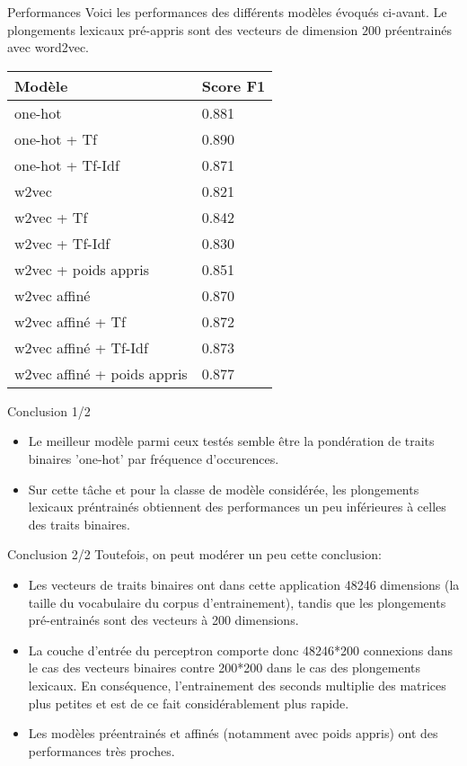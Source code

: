 \documentclass{beamer}
\begin{document}
\begin{frame}{Performances}
  Voici les performances des diff\'erents mod\`eles \'evoqu\'es ci-avant. Le plongements lexicaux pr\'e-appris sont des vecteurs de dimension $200$ pr\'eentrain\'es avec word2vec.

  \begin{center}
    \begin{tabular}{|l|l|}\hline
      Mod\`ele & Score F1\\\hline
      one-hot  & 0.881\\\hline
      one-hot + Tf & 0.890  \\\hline
      one-hot + Tf-Idf & 0.871  \\\hline
      w2vec & 0.821 \\\hline
      w2vec + Tf & 0.842 \\\hline
      w2vec + Tf-Idf & 0.830 \\\hline
      w2vec + poids appris & 0.851  \\\hline
      w2vec affin\'e & 0.870 \\\hline
      w2vec affin\'e + Tf & 0.872 \\\hline
      w2vec affin\'e + Tf-Idf & 0.873 \\\hline
      w2vec affin\'e + poids appris & 0.877 \\\hline
    \end{tabular}
  \end{center}  
\end{frame}

\begin{frame}{Conclusion 1/2}
  \begin{itemize}
  \item Le meilleur mod\`ele parmi ceux test\'es semble \^etre la pond\'eration de traits binaires 'one-hot' par fr\'equence d'occurences.
  \item Sur cette t\^ache et pour la classe de mod\`ele consid\'er\'ee, les plongements lexicaux pr\'entrain\'es obtiennent des performances un peu inf\'erieures \`a celles des traits binaires.
  \end{itemize}
\end{frame}

\begin{frame}{Conclusion 2/2}
  Toutefois, on peut mod\'erer un peu cette conclusion:
  \begin{itemize}
  \item Les vecteurs de traits binaires ont dans cette application 48246 dimensions (la taille du vocabulaire du corpus d'entrainement), tandis que les plongements pr\'e-entrain\'es sont des vecteurs \`a 200 dimensions.
  \item La couche d'entr\'ee du perceptron comporte donc 48246*200 connexions dans le cas des vecteurs binaires contre 200*200 dans le cas des plongements lexicaux. En cons\'equence, l'entrainement des seconds multiplie des matrices plus petites et est de ce fait consid\'erablement plus rapide.
  \item Les mod\`eles pr\'eentrain\'es et affin\'es (notamment avec poids appris) ont des performances tr\`es proches.
  \end{itemize}
\end{frame}
\end{document}
